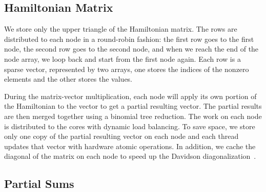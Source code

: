 \documentclass[%
reprint,
 superscriptaddress,
 amsmath,amssymb,
 aps,
]{revtex4-1}
\begin{document}
\subsection{Hamiltonian Matrix}

We store only the upper triangle of the Hamiltonian matrix.
The rows are distributed to each node in a round-robin fashion: the first row goes to the first node, the second row goes to the second node,
and when we reach the end of the node array, we loop back and start from the first node again.
Each row is a sparse vector, represented by two arrays, one stores the indices of the nonzero elements and the other stores the values.


During the matrix-vector multiplication, each node will apply its own portion of the Hamiltonian to the vector to get a partial resulting vector.
The partial results are then merged together using a binomial tree reduction.
The work on each node is distributed to the cores with dynamic load balancing.
To save space, we store only one copy of the partial resulting vector on each node and each thread updates that vector with hardware atomic operations.
In addition, we cache the diagonal of the matrix on each node to speed up the Davidson diagonalization~\cite{Dav-CPC-89}.

\subsection{Partial Sums}
%
%
\end{document}
